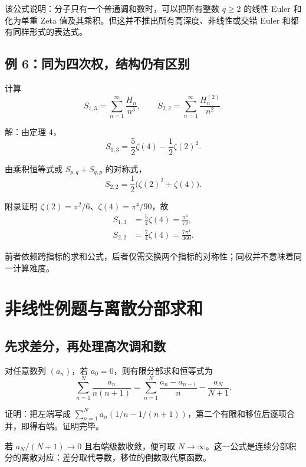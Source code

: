 \documentclass[11pt,a4paper]{article}
\newenvironment{proofblock}{\par\Needspace{4\baselineskip}\noindent}{\par}
\begin{document}
该公式说明：分子只有一个普通调和数时，可以把所有整数 \(q\geqslant2\) 的线性 Euler 和化为单重 Zeta 值及其乘积。但这并不推出所有高深度、非线性或交错 Euler 和都有同样形式的表达式。

\hypertarget{sec-7-4}{%
\subsection{例 6：同为四次权，结构仍有区别}\label{sec-7-4}}

计算
\[
S_{1,3}=\sum_{n=1}^{\infty}\frac{H_n}{n^3},
\qquad
S_{2,2}=\sum_{n=1}^{\infty}\frac{H_n^{(2)}}{n^2}.
\]

\noindent

解：由定理 4，
\[
S_{1,3}=\frac52\zeta(4)-\frac12\zeta(2)^2.
\]

由乘积恒等式或 \(S_{p,q}+S_{q,p}\) 的对称式，
\[
S_{2,2}=\frac12\bigl(\zeta(2)^2+\zeta(4)\bigr).
\]

附录证明 \(\zeta(2)=\pi^2/6\)、\(\zeta(4)=\pi^4/90\)，故
\[
\begin{aligned}
S_{1,3}&=\frac54\zeta(4)=\frac{\pi^4}{72},\\
S_{2,2}&=\frac74\zeta(4)=\frac{7\pi^4}{360}.
\end{aligned}
\]

前者依赖跨指标的求和公式，后者仅需交换两个指标的对称性；同权并不意味着同一计算难度。

\hypertarget{sec-8}{%
\section{非线性例题与离散分部求和}\label{sec-8}}

\hypertarget{sec-8-1}{%
\subsection{先求差分，再处理高次调和数}\label{sec-8-1}}

对任意数列 \((a_n)\)，若 \(a_0=0\)，则有限分部求和恒等式为
\[
\sum_{n=1}^{N}\frac{a_n}{n(n+1)}
=\sum_{n=1}^{N}\frac{a_n-a_{n-1}}n
-\frac{a_N}{N+1}.
\]

\begin{proofblock}

证明：把左端写成 \(\sum_{n=1}^{N}a_n(1/n-1/(n+1))\)，第二个有限和移位后逐项合并，即得右端。证明完毕。

\end{proofblock}

若 \(a_N/(N+1)\to0\) 且右端级数收敛，便可取 \(N\to\infty\)。这一公式是连续分部积分的离散对应：差分取代导数，移位的倒数取代原函数。
\end{document}
